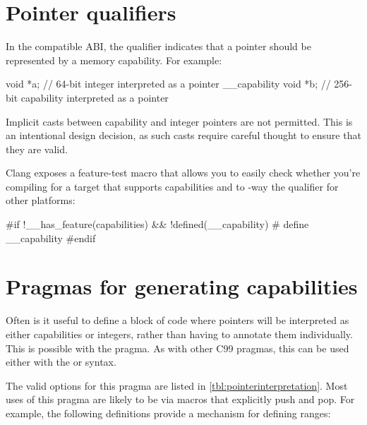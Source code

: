 \section{Pointer qualifiers}

In the compatible ABI, the  qualifier indicates that a pointer should be represented by a memory capability.
For example:

\begin{csnippet}
void *a; // 64-bit integer interpreted as a pointer
__capability void *b; // 256-bit capability interpreted as a pointer
\end{csnippet}

Implicit casts between capability and integer pointers are not permitted.
This is an intentional design decision, as such casts require careful thought to ensure that they are valid.

Clang exposes a feature-test macro that allows you to easily check whether you're compiling for a target that supports capabilities and to -way the  qualifier for other platforms:

\begin{csnippet}
	#if !__has_feature(capabilities) && !defined(__capability)
	#   define __capability
	#endif
\end{csnippet}


\section{Pragmas for generating capabilities}

Often is it useful to define a block of code where pointers will be interpreted as either capabilities or integers, rather than having to annotate them individually.
This is possible with the  pragma.
As with other C99 pragmas, this can be used either with the  or  syntax.

The valid options for this pragma are listed in \autoref{tbl:pointerinterpretation}.
Most uses of this pragma are likely to be via macros that explicitly push and pop.
For example, the following definitions provide a mechanism for defining ranges:

